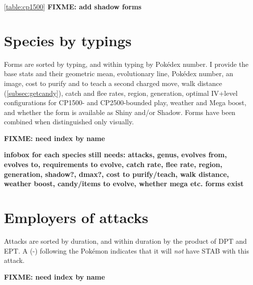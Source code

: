 \documentclass[ebook,10pt,openany,oneside]{memoir}
\begin{document}
\autoref{table:cp1500}
\textbf{FIXME: add shadow forms}


\chapter{Species by typings}
\label{chap:speciesbytype}
Forms are sorted by typing, and within typing by Pokédex number.
I provide the base stats and their geometric mean, evolutionary line,
 Pokédex number, an image, cost to purify and to teach a second charged
 move, walk distance (\autoref{subsec:getcandy}), catch and flee rates,
 region, generation, optimal IV+level configurations for CP1500-
 and CP2500-bounded play, weather and Mega boost, and whether the
 form is available as Shiny and/or Shadow.
Forms have been combined when distinguished only visually.

\textbf{FIXME: need index by name}

\textbf{infobox for each species still needs: attacks, genus, evolves from, evolves to,
           requirements to evolve, catch rate, flee rate, region, generation, shadow?, dmax?,
           cost to purify/teach, walk distance, weather boost, candy/items to evolve,
           whether mega etc. forms exist}

\chapter{Employers of attacks}
\label{chap:attackemployers}
Attacks are sorted by duration, and within duration by the product of DPT and EPT\@.
A (-) following the Pokémon indicates that it will \textit{not} have STAB with this attack.

\textbf{FIXME: need index by name}

\backmatter

\end{document}
